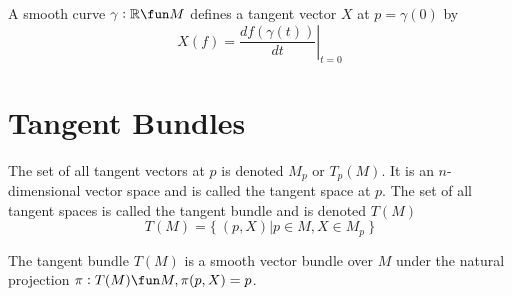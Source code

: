 \documentclass[11pt, oneside]{article}
\begin{document}
    A smooth curve $\gamma: \R \fun M$ defines a tangent vector $X$ at $p=\gamma(0)$ by
    \begin{equation}
        X(f) = \left.\frac{df(\gamma(t))}{dt}\right|_{t=0}
    \end{equation}

    \section{Tangent Bundles}

    The set of all tangent vectors at $p$ is denoted $M_p$ or $T_p(M)$.
    It is an $n$-dimensional vector space and is called the tangent space at $p$.
    The set of all tangent spaces is called the tangent bundle and is denoted $T(M)$
    \begin{equation}
        T(M) = \{~ (p,X) | p \in M, X \in M_p ~\}
    \end{equation}

    The tangent bundle $T(M)$ is a smooth vector bundle over $M$ under the natural projection
    $\pi: T(M) \fun M, \pi(p,X) = p$.

    \printbibliography
\end{document}

